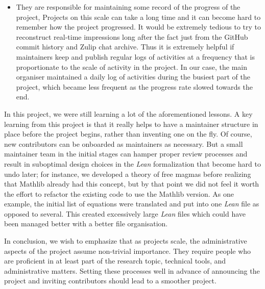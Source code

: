 \begin{itemize}
    \item They are responsible for maintaining some record of the progress of the project, Projects on this scale can take a long time and it can become hard to remember how the project progressed. It would be extremely tedious to try to reconstruct real-time impressions long after the fact just from the GitHub commit history and Zulip chat archive. Thus it is extremely helpful if maintainers keep and publish regular logs of activities at a frequency that is proportionate to the scale of activity in the project.  In our case, the main organiser maintained a daily log of activities during the busiest part of the project, which became less frequent as the progress rate slowed towards the end.
\end{itemize}

In this project, we were still learning a lot of the aforementioned lessons. A key learning from this project is that it really helps to have a maintainer structure in place before the project begins, rather than inventing one on the fly. Of course, new contributors can be onboarded as maintainers as necessary. But a small maintainer team in the initial stages can hamper proper review processes and result in suboptimal design choices in the  \emph{Lean} formalization that become hard to undo later; for instance, we developed a theory of free magmas before realizing that Mathlib already had this concept, but by that point we did not feel it worth the effort to refactor the existing code to use the Mathlib version. As one example, the initial list of equations were translated and put into one  \emph{Lean} file as opposed to several. This created excessively large  \emph{Lean} files which could have been managed better with a better file organisation.

In conclusion, we wish to emphasize that as projects scale, the administrative aspects of the project assume non-trivial importance. They require people who are proficient in at least part of the research topic, technical tools, and administrative matters. Setting these processes well in advance of announcing the project and inviting contributors should lead to a smoother project.

